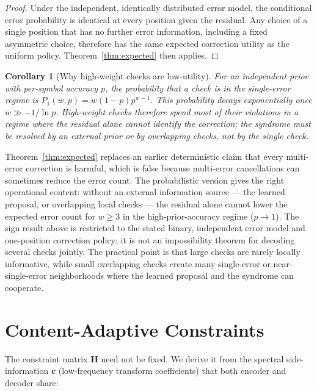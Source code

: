 \documentclass[11pt,a4paper]{article}
\newtheorem{corollary}[theorem]{Corollary}
\begin{document}
\begin{proof}
Under the independent, identically distributed error model, the
conditional error probability is identical at every position given the
residual. Any choice of a single position that has no further error
information, including a fixed asymmetric choice, therefore has the same
expected correction utility as the uniform policy.
Theorem~\ref{thm:expected} then applies.
\end{proof}

\begin{corollary}[Why high-weight checks are low-utility]\label{cor:global}
For an independent prior with per-symbol accuracy $p$, the probability
that a check is in the single-error regime is
$P_1(w,p) = w(1-p)p^{w-1}$. This probability decays exponentially once
$w \gg -1/\ln p$. High-weight checks therefore spend most of their
violations in a regime where the residual alone cannot identify the
correction; the syndrome must be resolved by an external prior or by
overlapping checks, not by the single check.
\end{corollary}

\smallskip
Theorem~\ref{thm:expected} replaces an earlier deterministic claim
that every multi-error correction is harmful, which is false because
multi-error cancellations can sometimes reduce the error count. The
probabilistic version gives the right operational content: without an
external information source --- the learned proposal, or overlapping
local checks --- the residual alone cannot lower the expected error
count for $w \geq 3$ in the high-prior-accuracy regime ($p \to 1$). The sign result above is restricted to the stated binary, independent
error model and one-position correction policy; it is not an impossibility
theorem for decoding several checks jointly. The practical
point is that large checks are rarely locally informative, while small
overlapping checks create many single-error or near-single-error
neighborhoods where the learned proposal and the syndrome can
cooperate.

\section{Content-Adaptive Constraints}
\label{sec:adaptive}

The constraint matrix $\mathbf{H}$ need not be fixed. We derive it
from the spectral side-information $\mathbf{c}$ (low-frequency transform coefficients)
that both encoder and decoder share:
\end{document}
